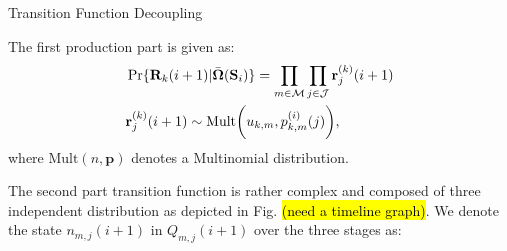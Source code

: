\documentclass[10pt, conference, letterpaper]{IEEEtran}
\newcommand{\Mult}{\text{Mult}}
\renewcommand{\vec}{\mathbf}
\DeclarePairedDelimiter{\Paren}{\bigg(}{\bigg)}
\newcommand{\apSet}{\mathcal{K}}
\newcommand{\esSet}{\mathcal{M}}
\newcommand{\jSpace}{\mathcal{J}}
\newcommand{\Stat}{\mathbf{S}}
\newcommand{\Policy}{\boldsymbol{\Omega}}
\newcommand{\BPolicy}{\bar{\Policy}}
\begin{document}
    \appendices

    \begin{section}{Transition Function Decoupling}
        \label{trans-decouple}

        The first production part is given as:
        \begin{align*}
            &\Pr\{\vec{R}_k(i+1)|\BPolicy(\Stat_i)\} = \prod_{m\in\esSet}\prod_{j\in\jSpace} \vec{r}^{(k)}_{j}(i+1)
            \\
            &\vec{r}^{(k)}_{j}(i+1) \sim \Mult\Paren{u_{k,m},p^{(i)}_{k,m}(j)},
        \end{align*}
        where $\Mult(n, \vec{p})$ denotes a Multinomial distribution.
            
        The second part transition function is rather complex and composed of three independent distribution as depicted in Fig. \hl{(need a timeline graph)}.
        We denote the state $n_{m,j}(i+1)$ in $Q_{m,j}(i+1)$ over the three stages as:

\end{section}
\end{document}

